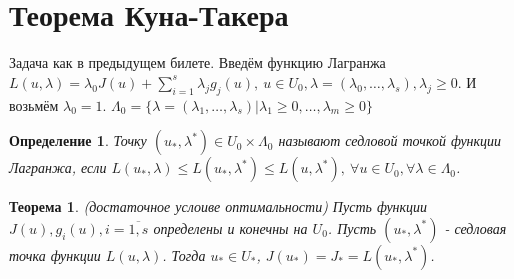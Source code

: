 \documentclass[9pt, a4paper]{extarticle}
\newtheorem*{theorem}{Теорема}
\newtheorem*{definition}{Определение}
\begin{document}
\section{Теорема Куна-Такера}
	Задача как в предыдущем билете. \newline
		Введём функцию Лагранжа $L(u, \lambda) = \lambda_0 J(u) + \sum\limits_{i=1}^s \lambda_j g_j(u), \ u \in U_0, \lambda = (\lambda_0, \dots, \lambda_s), \lambda_j \geq 0$. И возьмём $\lambda_0 = 1$.  \newline
		$\Lambda_0 = \{\lambda = (\lambda_1, \dots, \lambda_s) \vert \lambda_1 \geq 0, \dots , \lambda_m \geq 0\}$
	\begin{definition}
		Точку $(u_*, \lambda^*) \in U_0 \times \Lambda_0$ называют седловой точкой функции Лагранжа, если $L(u_*, \lambda) \leq L(u_*, \lambda^*) \leq L(u, \lambda^*), \ \forall u \in U_0, \forall \lambda \in \Lambda_0$.
	\end{definition}
	\begin{theorem}
		(достаточное услоиве оптимальности)\newline
		Пусть функции $J(u), g_i(u), i=\overline{1,s}$ определены и конечны на $U_0$. Пусть $(u_*, \lambda^*)$ - седловая точка функции $L(u, \lambda)$. Тогда $u_* \in U_*$, $J(u_*) = J_* = L(u_*, \lambda^*)$.	
	\end{theorem}
\end{document}
